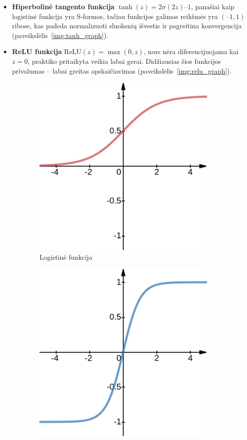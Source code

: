 \documentclass{VUMIFPSbakalaurinis}
\begin{document}
{\begin{itemize}
		\item \textbf{Hiperbolinė tangento funkcija} \(\tanh(z) = 2\sigma(2z) – 1\), panašiai kaip logistinė funkcija yra S-formos, tačiau funkcijos galimos reikšmės yra \((–1, 1)\) ribose, kas padeda normalizuoti sluoksnių išvestis ir pagreitina konvergencija (paveikslėlis~\ref{img:tanh_graph}).
		
		\item \textbf{ReLU funkcija} \(\textrm{ReLU}(z) = \max(0, z)\), nors nėra diferencijuojama kai \(z=0\), praktiko pritaikyta veikia labai gerai. Didžiausias šios funkcijos privalumas -- labai greitas apskaičiavimas (paveikslėlis~\ref{img:relu_graph}).
	\end{itemize}
	
	
	\begin{figure}[H]
		\centering
		\begin{subfigure}[b]{.333\textwidth}
			\centering
			\includegraphics[width=.75\textwidth]{img/log_graph}
			\caption{Logistinė funkcija}
			\label{img:log_graph}
		\end{subfigure}%
		\begin{subfigure}[b]{.333\textwidth}
			\centering
			\includegraphics[width=.75\textwidth]{img/tanh_graph}

\end{subfigure}
\end{figure}}
\end{document}
